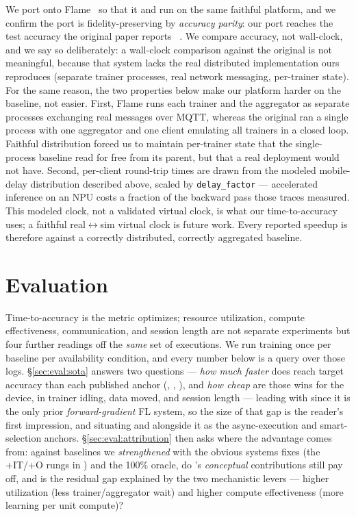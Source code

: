 We port \fwdllm{} onto Flame~\cite{daga2023flame} so that it and
\sys{} run on the same faithful platform, and we confirm the port is
fidelity-preserving by \emph{accuracy parity}: our port reaches the
test accuracy the original paper reports~\cite{xu2024fwdllm}
. We
compare accuracy, not wall-clock, and we say so deliberately: a
wall-clock comparison against the original is not meaningful, because
that system lacks the real distributed implementation ours reproduces
(separate trainer processes, real network messaging, per-trainer
state). For the same reason, the two properties below make our
platform harder on the baseline, not easier. First, Flame runs each
trainer and the aggregator as separate processes exchanging real
messages over MQTT, whereas the original ran a single process with one
aggregator and one client emulating all trainers in a closed loop.
Faithful distribution forced us to maintain per-trainer state that the
single-process baseline read for free from its parent, but that a real
deployment would not have. Second, per-client round-trip times are
drawn from the modeled mobile-delay distribution described above,
scaled by \texttt{delay\_factor} --- accelerated inference on an NPU
costs a fraction of the backward pass those traces measured. This
modeled clock, not a validated virtual clock, is what our
time-to-accuracy uses; a faithful real$\leftrightarrow$sim virtual
clock is future work. Every reported speedup is therefore against a
correctly distributed, correctly aggregated baseline.

\section{Evaluation}
\label{sec:eval}

Time-to-accuracy is the metric \sys{} optimizes; resource utilization,
compute effectiveness, communication, and session length are not
separate experiments but four further readings off the \emph{same} set
of executions. We run training once per baseline per availability
condition, and every number below is a query over those logs.
\S\ref{sec:eval:sota} answers two questions --- \emph{how much faster}
does \sys{} reach target accuracy than each published anchor
(\fwdllm{}, \fedbuffp{}, \felixp{}), and \emph{how cheap} are those
wins for the device, in trainer idling, data moved, and session length
--- leading with \fwdllm{} since it is the only prior
\emph{forward-gradient} FL system, so the size of that gap is the
reader's first impression, and situating \fedbuffp{} and \felixp{}
alongside it as the async-execution and smart-selection anchors.
\S\ref{sec:eval:attribution} then asks where the advantage comes from:
against baselines we \emph{strengthened} with the obvious systems
fixes (the +IT/+O rungs in ) and the 100\%
oracle, do \sys{}'s \emph{conceptual} contributions still pay off, and
is the residual gap explained by the two mechanistic levers --- higher
utilization (less trainer/aggregator wait) and higher compute
effectiveness (more learning per unit compute)?

